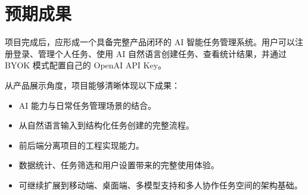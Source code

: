 \documentclass[UTF8,a4paper,12pt,fontset=fandol]{ctexart}
\begin{document}
\section{预期成果}

项目完成后，应形成一个具备完整产品闭环的 AI 智能任务管理系统。用户可以注册登录、管理个人任务、使用 AI 自然语言创建任务、查看统计结果，并通过 BYOK 模式配置自己的 OpenAI API Key。

从产品展示角度，项目能够清晰体现以下成果：

\begin{itemize}
  \item AI 能力与日常任务管理场景的结合。
  \item 从自然语言输入到结构化任务创建的完整流程。
  \item 前后端分离项目的工程实现能力。
  \item 数据统计、任务筛选和用户设置带来的完整使用体验。
  \item 可继续扩展到移动端、桌面端、多模型支持和多人协作任务空间的架构基础。
\end{itemize}
\end{document}
